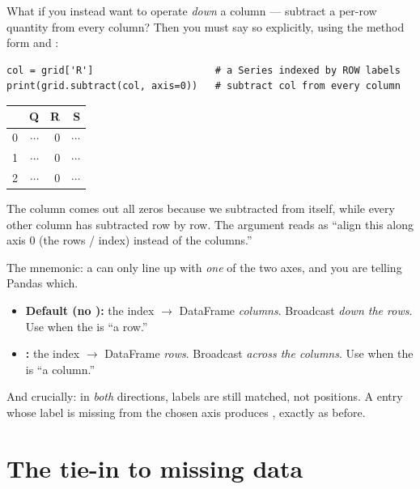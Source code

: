 \documentclass[11pt]{article}
\begin{document}
What if you instead want to operate \emph{down} a column --- subtract a per-row quantity from every column? Then you must say so explicitly, using the method form and :

\begin{lstlisting}
col = grid['R']                     # a Series indexed by ROW labels
print(grid.subtract(col, axis=0))   # subtract col from every column
\end{lstlisting}

\begin{outbox}
\begin{tabular}{l r r r}
\toprule
 & \textbf{Q} & \textbf{R} & \textbf{S} \\
\midrule
0 & $\cdots$ & $0$ & $\cdots$ \\
1 & $\cdots$ & $0$ & $\cdots$ \\
2 & $\cdots$ & $0$ & $\cdots$ \\
\bottomrule
\end{tabular}
\end{outbox}

The  column comes out all zeros because we subtracted  from itself, while every other column has  subtracted row by row. The argument  reads as ``align this  along axis 0 (the rows / index) instead of the columns.''

\begin{intuition}
The mnemonic: a  can only line up with \emph{one} of the two axes, and you are telling Pandas which.
\begin{itemize}
  \item \textbf{Default (no ):} the  index $\to$ DataFrame \emph{columns}. Broadcast \emph{down the rows}. Use when the  is ``a row.''
  \item \textbf{:} the  index $\to$ DataFrame \emph{rows}. Broadcast \emph{across the columns}. Use when the  is ``a column.''
\end{itemize}
And crucially: in \emph{both} directions, labels are still matched, not positions. A  entry whose label is missing from the chosen axis produces , exactly as before.
\end{intuition}

\section{The tie-in to missing data}
\end{document}
